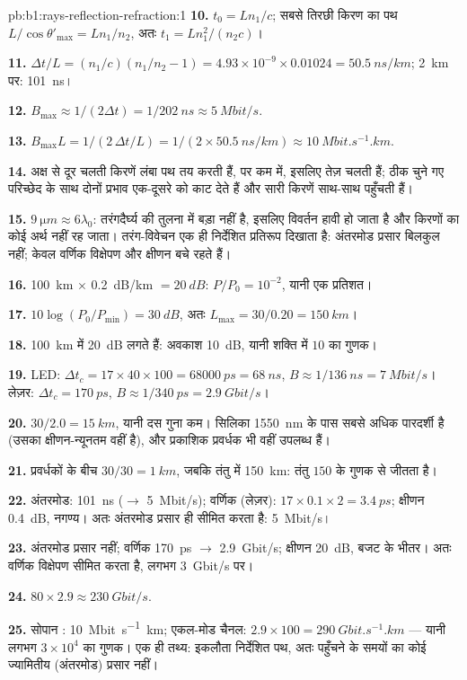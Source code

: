 \begin{solution}{pb:b1:rays-reflection-refraction:1}
\textbf{10.} $t_0 = Ln_1/c$; सबसे तिरछी किरण का पथ $L/\cos\theta'_{\max} =
Ln_1/n_2$, अतः $t_1 = Ln_1^2/(n_2 c)$।

\textbf{11.} $\Delta t/L = (n_1/c)(n_1/n_2 - 1) = 4.93\times10^{-9} \times
0.01024 = \qty{50.5}{ns/km}$; \qty{2}{km} पर: \qty{101}{ns}।

\textbf{12.} $B_{\max} \approx 1/(2\Delta t) = 1/\qty{202}{ns} \approx
\qty{5}{Mbit/s}$.

\textbf{13.} $B_{\max} L = 1/(2\,\Delta t/L) = 1/(2 \times
\qty{50.5}{ns/km}) \approx \qty{10}{Mbit.s^{-1}.km}$.

\textbf{14.} अक्ष से दूर चलती किरणें लंबा पथ तय करती हैं, पर कम 
में, इसलिए तेज़ चलती हैं; ठीक चुने गए परिच्छेद के साथ दोनों प्रभाव एक-दूसरे को
काट देते हैं और सारी किरणें साथ-साथ पहुँचती हैं।

\textbf{15.} $\qty{9}{\micro m} \approx 6\lambda_0$:  तरंगदैर्घ्य की
तुलना में बड़ा नहीं है, इसलिए विवर्तन हावी हो जाता है और किरणों का कोई अर्थ
नहीं रह जाता। तरंग-विवेचन एक ही निर्देशित प्रतिरूप दिखाता है: अंतरमोड प्रसार
बिलकुल नहीं; केवल वर्णिक विक्षेपण और क्षीणन बचे रहते हैं।

\textbf{16.} \qty{100}{km} $\times$ \qty{0.2}{dB/km} $= \qty{20}{dB}$:
$P/P_0 = 10^{-2}$, यानी एक प्रतिशत।

\textbf{17.} $10\log(P_0/P_{\min}) = \qty{30}{dB}$, अतः $L_{\max} =
30/0.20 = \qty{150}{km}$।

\textbf{18.} \qty{100}{km} में \qty{20}{dB} लगते हैं: अवकाश \qty{10}{dB},
यानी शक्ति में $10$ का गुणक।

\textbf{19.} LED: $\Delta t_c = 17 \times 40 \times 100 = \qty{68000}{ps}
= \qty{68}{ns}$, $B \approx 1/\qty{136}{ns} = \qty{7}{Mbit/s}$। लेज़र:
$\Delta t_c = \qty{170}{ps}$, $B \approx 1/\qty{340}{ps} =
\qty{2.9}{Gbit/s}$।

\textbf{20.} $30/2.0 = \qty{15}{km}$, यानी दस गुना कम। सिलिका
\qty{1550}{nm} के पास सबसे अधिक पारदर्शी है (उसका क्षीणन-न्यूनतम वहीं है), और
प्रकाशिक प्रवर्धक भी वहीं उपलब्ध हैं।

\textbf{21.} प्रवर्धकों के बीच $30/30 = \qty{1}{km}$, जबकि तंतु में
\qty{150}{km}: तंतु $150$ के गुणक से जीतता है।

\textbf{22.} अंतरमोड: \qty{101}{ns} ($\to$ \qty{5}{Mbit/s});
वर्णिक (लेज़र): $17 \times 0.1 \times 2 = \qty{3.4}{ps}$;
क्षीणन \qty{0.4}{dB}, नगण्य। अतः अंतरमोड प्रसार ही सीमित करता है:
\qty{5}{Mbit/s}।

\textbf{23.} अंतरमोड प्रसार नहीं; वर्णिक \qty{170}{ps} $\to$
\qty{2.9}{Gbit/s}; क्षीणन \qty{20}{dB}, बजट के भीतर। अतः वर्णिक
विक्षेपण सीमित करता है, लगभग \qty{3}{Gbit/s} पर।

\textbf{24.} $80 \times 2.9 \approx \qty{230}{Gbit/s}$.

\textbf{25.} सोपान : \qty{10}{Mbit.s^{-1}.km}; एकल-मोड चैनल:
$2.9 \times 100 = \qty{290}{Gbit.s^{-1}.km}$ --- यानी लगभग
$3\times10^4$ का गुणक। एक ही तथ्य: इकलौता निर्देशित पथ, अतः पहुँचने के समयों
का कोई ज्यामितीय (अंतरमोड) प्रसार नहीं।
\end{solution}
